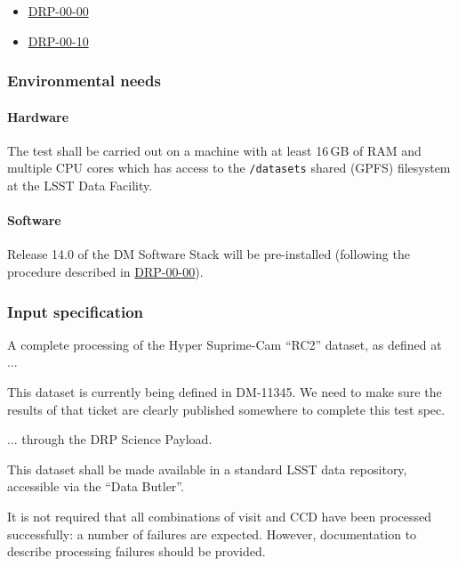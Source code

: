 \begin{itemize}

  \item{\hyperref[drp-00-00]{DRP-00-00}}
  \item{\hyperref[drp-00-10]{DRP-00-10}}

\end{itemize}

\subsubsection{Environmental needs}

\paragraph{Hardware}

The test shall be carried out on a machine with at least 16\,GB of RAM and
multiple CPU cores which has access to the \texttt{/datasets} shared (GPFS)
filesystem at the LSST Data Facility.

\paragraph{Software}

Release 14.0 of the DM Software Stack will be pre-installed (following the
procedure described in \hyperref[drp-00-00]{DRP-00-00}).

\subsubsection{Input specification}

A complete processing of the Hyper Suprime-Cam ``RC2'' dataset, as defined
at ...

\begin{note}
This dataset is currently being defined in DM-11345. We need to make sure the
results of that ticket are clearly published somewhere to complete this test
spec.

\end{note}

... through the DRP Science Payload.

This dataset shall be made available in a standard LSST data repository,
accessible via the ``Data Butler''.

It is not required that all combinations of visit and CCD have been processed
successfully: a number of failures are expected. However, documentation to
describe processing failures should be provided.

